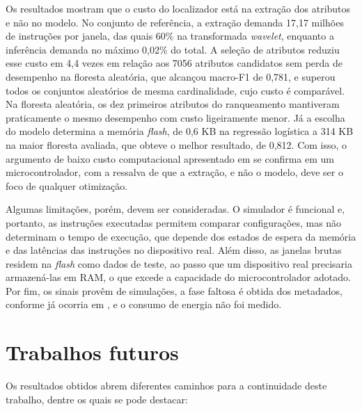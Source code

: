 \documentclass[
	12pt,				%
	openright,			%
	oneside,			%
	a4paper,			%
	english,			%
	brazil,				%
	]{abntex2}
\begin{document}
Os resultados mostram que o custo do localizador está na extração dos atributos e não no modelo. No conjunto de referência, a extração demanda 17,17 milhões de instruções por janela, das quais 60\% na transformada \textit{wavelet}, enquanto a inferência demanda no máximo 0,02\% do total. A seleção de atributos reduziu esse custo em 4,4 vezes em relação aos 7056 atributos candidatos sem perda de desempenho na floresta aleatória, que alcançou macro-F1 de 0,781, e superou todos os conjuntos aleatórios de mesma cardinalidade, cujo custo é comparável. Na floresta aleatória, os dez primeiros atributos do ranqueamento mantiveram praticamente o mesmo desempenho com custo ligeiramente menor. Já a escolha do modelo determina a memória \textit{flash}, de 0,6 KB na regressão logística a 314 KB na maior floresta avaliada, que obteve o melhor resultado, de 0,812. Com isso, o argumento de baixo custo computacional apresentado em  se confirma em um microcontrolador, com a ressalva de que a extração, e não o modelo, deve ser o foco de qualquer otimização.

Algumas limitações, porém, devem ser consideradas. O simulador é funcional e, portanto, as instruções executadas permitem comparar configurações, mas não determinam o tempo de execução, que depende dos estados de espera da memória e das latências das instruções no dispositivo real. Além disso, as janelas brutas residem na \textit{flash} como dados de teste, ao passo que um dispositivo real precisaria armazená-las em RAM, o que excede a capacidade do microcontrolador adotado. Por fim, os sinais provêm de simulações, a fase faltosa é obtida dos metadados, conforme já ocorria em , e o consumo de energia não foi medido.

\section{Trabalhos futuros}
\label{sec:trabalhos-futuros}

Os resultados obtidos abrem diferentes caminhos para a continuidade deste trabalho, dentre os quais se pode destacar:
\end{document}
